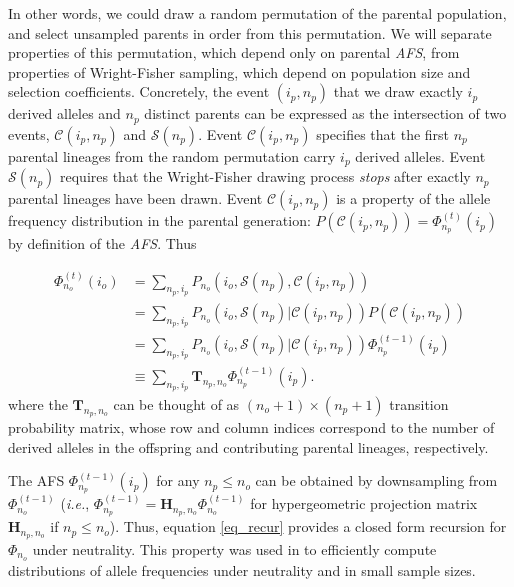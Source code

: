 \documentclass[review]{elsarticle}
\newcommand{\afs}[2]{\Phi_{#1}^{(#2)}}
\begin{document}
In other words, we could draw a random permutation of the parental population, and select unsampled parents
in order from this permutation. We will separate properties of this permutation, which depend only
on parental \textit{AFS}, from properties of Wright-Fisher sampling, which depend on population
size and selection coefficients.  Concretely, the event $(i_p,n_p)$ that we draw exactly $i_p$
derived alleles and $n_p$ distinct parents can be expressed as the intersection of two events,
$\mathcal{C}(i_p,n_p)$ and $\mathcal{S}(n_p)$. Event $\mathcal{C}(i_p,n_p)$ specifies that the
first $n_p$ parental lineages from the random permutation carry $i_p$ derived alleles. Event
$\mathcal{S}(n_p)$ requires that the Wright-Fisher drawing process \textit{stops} after exactly
$n_p$ parental lineages have been drawn. Event $\mathcal{C}(i_p, n_p)$ is a property of the allele
frequency distribution in the parental generation: $P(\mathcal{C}(i_p,n_p)) =\afs{n_p}{t} (i_p)$
by definition of the \textit{AFS}. Thus 

\begin{equation}
  \begin{split}
    \afs{n_o}{t}(i_o)&= \sum_{n_p,i_p} P_{n_o}(i_o, \mathcal{S}(n_p), \mathcal{C}(i_p,n_p) )\\
    &=   \sum_{n_p,i_p} P_{n_o}(i_o, \mathcal{S}(n_p)| \mathcal{C}(i_p,n_p) ) P(\mathcal{C}(i_p,n_p))\\
    &=   \sum_{n_p,i_p} P_{n_o}(i_o, \mathcal{S}(n_p)| \mathcal{C}(i_p,n_p) )  \afs{n_p}{t-1}(i_p)\\
    &\equiv  \sum_{n_p,i_p}  \mathbf{T}_{n_p,n_o}     \afs{n_p}{t-1}(i_p).
  \end{split}
  \label{eq_recur}
\end{equation}
where the $\mathbf{T}_{n_p,n_o}$ can be thought of as $(n_o+1) \times (n_p+1)$ transition
probability matrix, whose row and column indices correspond to the number of derived alleles in the
offspring and contributing parental lineages, respectively.

The AFS  $\afs{n_p}{t-1}(i_p)$ for any  $n_p\leq n_o$ can be obtained by downsampling from $\afs{n_o}{t-1}$ (\textit{i.e.}, $\afs{n_p}{t-1} =
\mathbf{H}_{n_p,n_o} \afs{n_o}{t-1}$ for hypergeometric projection matrix $\mathbf{H}_{n_p,n_o}$ if
$n_p\leq n_o$). Thus, equation \eqref{eq_recur} provides a closed form recursion for $\Phi_{n_o}$ under neutrality.
This property was used in \cite{JouganousEtAl2017} to efficiently compute distributions of allele
frequencies under neutrality and in small sample sizes.
\end{document}
